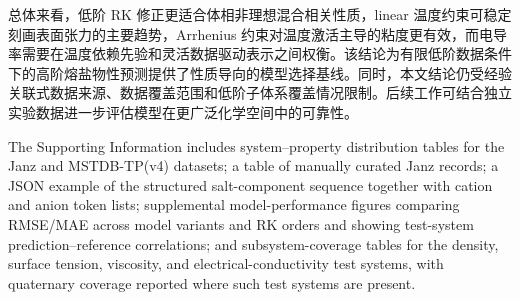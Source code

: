 \documentclass[journal=jctcce,manuscript=article,doi=true]{achemso}
\begin{document}
总体来看，低阶 RK 修正更适合体相非理想混合相关性质，linear 温度约束可稳定刻画表面张力的主要趋势，Arrhenius 约束对温度激活主导的粘度更有效，而电导率需要在温度依赖先验和灵活数据驱动表示之间权衡。该结论为有限低阶数据条件下的高阶熔盐物性预测提供了性质导向的模型选择基线。同时，本文结论仍受经验关联式数据来源、数据覆盖范围和低阶子体系覆盖情况限制。后续工作可结合独立实验数据进一步评估模型在更广泛化学空间中的可靠性。

\begin{suppinfo}
The Supporting Information includes system--property distribution tables for the Janz and MSTDB-TP(v4) datasets; a table of manually curated Janz records; a JSON example of the structured salt-component sequence together with cation and anion token lists; supplemental model-performance figures comparing RMSE/MAE across model variants and RK orders and showing test-system prediction--reference correlations; and subsystem-coverage tables for the density, surface tension, viscosity, and electrical-conductivity test systems, with quaternary coverage reported where such test systems are present.
\end{suppinfo}

\renewcommand{\refname}{参考文献}

\end{document}
